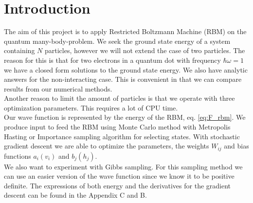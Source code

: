 \section{Introduction}

The aim of this project is to apply Restricted Boltzmann Machine (RBM) on the quantum many-body-problem. We seek the ground state energy of a system containing $N$ particles, however we will not extend the case of two particles. The reason for this is that for two electrons in a quantum dot with frequency $\hbar \omega = 1$ we have a closed form solutions to the ground state energy. We also have analytic answers for the non-interacting case. This is convenient in that we can compare results from our numerical methods.\\
Another reason to limit the amount of particles is that we operate with three optimization parameters. This requires a lot of CPU time.  \\
Our wave function is represented by the energy of the RBM, eq. \eqref{eq:F_rbm}. We produce input to feed the RBM using Monte Carlo method with Metropolis Hasting or Importance sampling algorithm for selecting states. With stochastic gradient descent we are able to optimize the parameters, the weights $W_{ij}$ and bias functions $a_i(v_i)$ and $b_j(h_j)$. \\
We also want to experiment with Gibbs sampling. For this sampling method we can use an easier version of the wave function since we know it to be positive definite. The expressions of both energy and the derivatives for the gradient descent can be found in the Appendix C and B. 
